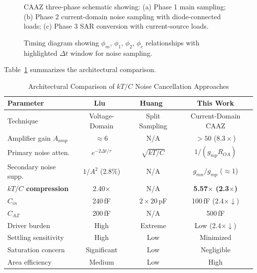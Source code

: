 \documentclass[journal]{IEEEtran}
\begin{document}
\begin{figure}[!t]
\centering
{}
\caption{CAAZ three-phase schematic showing: (a) Phase 1 main sampling; (b) Phase 2 current-domain noise sampling with diode-connected loads; (c) Phase 3 SAR conversion with current-source loads.}
\label{fig:schematic}
\end{figure}

\begin{figure}[!t]
\centering
{}
\caption{Timing diagram showing $\phi_m$, $\phi_1$, $\phi_2$, $\phi_c$ relationships with highlighted $\Delta t$ window for noise sampling.}
\label{fig:timing}
\end{figure}

Table~\ref{tab:comparison} summarizes the architectural comparison.

\begin{table}[!t]
\caption{Architectural Comparison of $kT/C$ Noise Cancellation Approaches}
\label{tab:comparison}
\centering
\scriptsize
\begin{tabular}{|l|c|c|c|}
\hline
\textbf{Parameter} & \textbf{Liu~\cite{liu202013bit}} & \textbf{Huang~\cite{huang2025split}} & \textbf{This Work} \\
\hline
Technique & Voltage-Domain & Split Sampling & Current-Domain CAAZ \\
\hline
Amplifier gain $A_{amp}$ & $\approx 6$ & N/A & $>50$ ($8.3\times$) \\
\hline
Primary noise atten. & $e^{-2\Delta t/\tau}$ & $\sqrt{kT/C}$ & $1/(g_{mp}R_{OA})$ \\
\hline
Secondary noise supp. & $1/A^2$ (2.8\%) & N/A & $g_{mn}/g_{mp}$ ($\approx 1$) \\
\hline
\textbf{$kT/C$ compression} & 2.40$\times$ & N/A & \textbf{5.57$\times$ (2.3$\times$)}  \\
\hline
$C_{in}$ & 240\,fF & $2\times 20$\,pF & 100\,fF (2.4$\times$$\downarrow$) \\
\hline
$C_{AZ}$ & 200\,fF & N/A & 500\,fF \\
\hline
Driver burden & High & Extreme & Low (2.4$\times$$\downarrow$) \\
\hline
Settling sensitivity & High & Low & Minimized \\
\hline
Saturation concern & Significant & Low & Negligible \\
\hline
Area efficiency & Medium & Low & High \\
\hline
\end{tabular}
\end{table}
\end{document}
